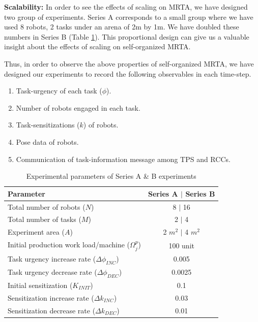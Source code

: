 \documentclass[smallcondensed]{svjour3}
\begin{document}
\textbf{Scalability:} In order to see the effects of scaling on MRTA, we have designed two group of experiments. Series A corresponds to a small group where we have used 8 robots, 2 tasks under an arena of 2m by 1m. We have doubled these numbers in Series B (Table \ref{table:params}). This proportional design can give us a valuable insight about the effects of scaling on self-organized MRTA. 

Thus, in order to observe the above properties of self-organized MRTA, we have designed our experiments to record the following  observables in each time-step.
\begin{enumerate}
\item Task-urgency of each task ($\phi$).
\item Number of robots engaged in each task.
\item Task-sensitizations ($k$) of robots.
\item Pose data of robots.
\item Communication of task-information message among TPS and RCCs.  
\end{enumerate}
\begin{table}
\caption{Experimental parameters of Series A \& B experiments}
\label{table:params}
\begin{center}
\begin{tabular}{|p{2in}|c|}
\hline Parameter & Series A $\mid$ Series B\\
\hline Total number of robots ($N$) & \hspace*{0.1cm} 8 $\mid$ 16\\
\hline Total number of tasks ($M$) & 2 $\mid$ 4\\
\hline Experiment area ($A$) & 2 $m^2$ $\mid$  4 $m^2$\\
\hline Initial production work load/machine ($\Omega_{j}^{p}$) & 100 unit \\
\hline Task urgency increase rate ($\Delta\phi_{INC}$) & 0.005\\
\hline Task urgency decrease rate ($\Delta\phi_{DEC}$) & 0.0025\\
\hline Initial sensitization ($K_{INIT}$) & 0.1\\
\hline Sensitization increase rate ($\Delta k_{INC}$) & 0.03\\
\hline Sensitization decrease rate ($\Delta k_{DEC}$) & 0.01\\
\hline
\end{tabular}
\end{center}
\end{table}
\end{document}
